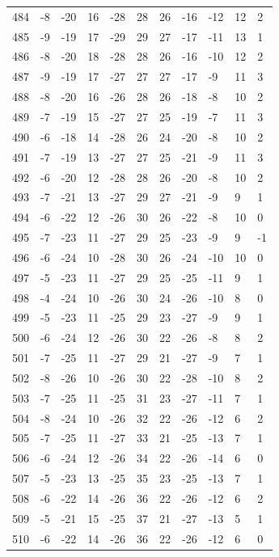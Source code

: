 \begin{table}[H]
\begin{tabular}{lllllllllll}
484 & -8 & -20 & 16 & -28 & 28 & 26 & -16 & -12 & 12 & 2 \\
485 & -9 & -19 & 17 & -29 & 29 & 27 & -17 & -11 & 13 & 1 \\
486 & -8 & -20 & 18 & -28 & 28 & 26 & -16 & -10 & 12 & 2 \\
487 & -9 & -19 & 17 & -27 & 27 & 27 & -17 & -9 & 11 & 3 \\
488 & -8 & -20 & 16 & -26 & 28 & 26 & -18 & -8 & 10 & 2 \\
489 & -7 & -19 & 15 & -27 & 27 & 25 & -19 & -7 & 11 & 3 \\
490 & -6 & -18 & 14 & -28 & 26 & 24 & -20 & -8 & 10 & 2 \\
491 & -7 & -19 & 13 & -27 & 27 & 25 & -21 & -9 & 11 & 3 \\
492 & -6 & -20 & 12 & -28 & 28 & 26 & -20 & -8 & 10 & 2 \\
493 & -7 & -21 & 13 & -27 & 29 & 27 & -21 & -9 & 9 & 1 \\
494 & -6 & -22 & 12 & -26 & 30 & 26 & -22 & -8 & 10 & 0 \\
495 & -7 & -23 & 11 & -27 & 29 & 25 & -23 & -9 & 9 & -1 \\
496 & -6 & -24 & 10 & -28 & 30 & 26 & -24 & -10 & 10 & 0 \\
497 & -5 & -23 & 11 & -27 & 29 & 25 & -25 & -11 & 9 & 1 \\
498 & -4 & -24 & 10 & -26 & 30 & 24 & -26 & -10 & 8 & 0 \\
499 & -5 & -23 & 11 & -25 & 29 & 23 & -27 & -9 & 9 & 1 \\
500 & -6 & -24 & 12 & -26 & 30 & 22 & -26 & -8 & 8 & 2 \\
501 & -7 & -25 & 11 & -27 & 29 & 21 & -27 & -9 & 7 & 1 \\
502 & -8 & -26 & 10 & -26 & 30 & 22 & -28 & -10 & 8 & 2 \\
503 & -7 & -25 & 11 & -25 & 31 & 23 & -27 & -11 & 7 & 1 \\
504 & -8 & -24 & 10 & -26 & 32 & 22 & -26 & -12 & 6 & 2 \\
505 & -7 & -25 & 11 & -27 & 33 & 21 & -25 & -13 & 7 & 1 \\
506 & -6 & -24 & 12 & -26 & 34 & 22 & -26 & -14 & 6 & 0 \\
507 & -5 & -23 & 13 & -25 & 35 & 23 & -25 & -13 & 7 & 1 \\
508 & -6 & -22 & 14 & -26 & 36 & 22 & -26 & -12 & 6 & 2 \\
509 & -5 & -21 & 15 & -25 & 37 & 21 & -27 & -13 & 5 & 1 \\
510 & -6 & -22 & 14 & -26 & 36 & 22 & -26 & -12 & 6 & 0 \\

\end{tabular}
\end{table}

